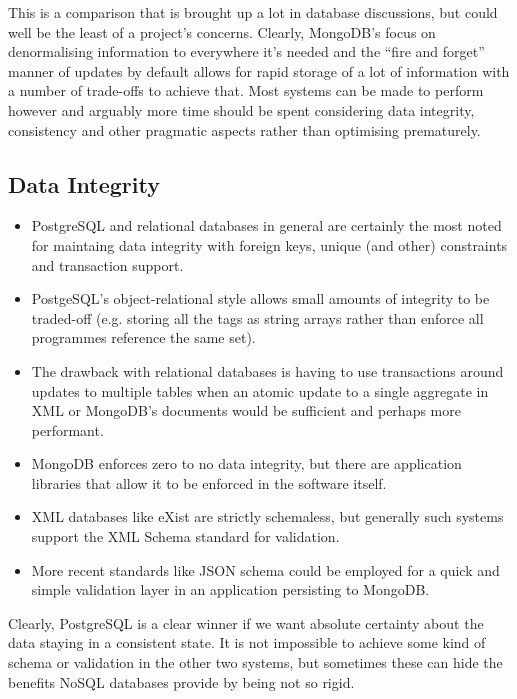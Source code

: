 \documentclass[11pt,a4paper]{article}
\begin{document}
This is a comparison that is brought up a lot in database discussions, but
could well be the least of a project's concerns. Clearly, MongoDB's focus
on denormalising information to everywhere it's needed and the
``fire and forget'' manner of updates by default allows for rapid storage
of a lot of information with a number of trade-offs to achieve that. Most
systems can be made to perform however and arguably more time should
be spent considering data integrity, consistency and other pragmatic aspects
rather than optimising prematurely.

\subsection{Data Integrity}

\begin{itemize}
  \item PostgreSQL and relational databases in general are certainly the
    most noted for maintaing data integrity with foreign keys, unique
    (and other) constraints and transaction support.
  \item PostgeSQL's object-relational style allows small amounts of
    integrity to be traded-off (e.g. storing all the tags as string
    arrays rather than enforce all programmes reference the same set).
  \item The drawback with relational databases is having to use transactions
    around updates to multiple tables when an atomic update to a single
    aggregate in XML or MongoDB's documents would be sufficient and perhaps
    more performant.
  \item MongoDB enforces zero to no data integrity, but there are
    application libraries that allow it to be enforced in the software
    itself.
  \item XML databases like eXist are strictly schemaless, but generally
    such systems support the XML Schema standard for validation.
  \item More recent standards like JSON schema could be employed for
    a quick and simple validation layer in an application persisting
    to MongoDB.
\end{itemize}

Clearly, PostgreSQL is a clear winner if we want absolute certainty
about the data staying in a consistent state. It is not impossible
to achieve some kind of schema or validation in the other two systems,
but sometimes these can hide the benefits NoSQL databases provide
by being not so rigid.
\end{document}
